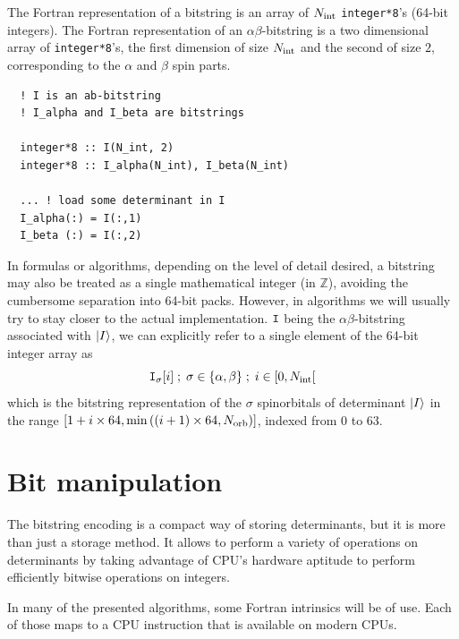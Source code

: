 \documentclass[./thesis.tex]{subfiles}
\begin{document}
The Fortran representation of a bitstring is an array of ${N_\text{int}}$ \lstinline{integer*8}'s (64-bit integers).  
The Fortran representation of an $\alpha \beta$-bitstring is a two dimensional array of \lstinline{integer*8}'s, the first dimension of size ${N_\text{int}}$ and the second of size $2$, corresponding to the $\alpha$ and $\beta$ spin parts.


\lstset{frame=single}
\begin{lstlisting}
  ! I is an ab-bitstring
  ! I_alpha and I_beta are bitstrings
  
  integer*8 :: I(N_int, 2)
  integer*8 :: I_alpha(N_int), I_beta(N_int)

  ... ! load some determinant in I
  I_alpha(:) = I(:,1)
  I_beta (:) = I(:,2)
\end{lstlisting}
\lstset{frame=none}


In formulas or algorithms, depending on the level of detail desired, a bitstring may also be treated as a single mathematical integer (in $\mathbb{Z}$), avoiding the cumbersome separation into 64-bit packs. However, in algorithms we will usually try to stay closer to the actual implementation. ${\texttt{I}}$ being the $\alpha \beta$-bitstring associated with ${\ket{I}}$, we can explicitly refer to a single element of the 64-bit integer array as
\begin{equation}
{\texttt{I}}_{\sigma}[i]\; ;\; \sigma \in \{\alpha, \beta\}\; ;\; i \in [0, {N_\text{int}}[
\end{equation}
which is the bitstring representation of the $\sigma$ spinorbitals of determinant ${\ket{I}}$ in the range $[1+i \times 64, \min \left( (i+1) \times 64, {N_\text{orb}} \right)]$, indexed from $0$ to $63$.

      
\section{Bit manipulation}

The bitstring encoding is a compact way of storing determinants, but it is more than just a storage method. It allows to perform a variety of operations on determinants by taking advantage of CPU's hardware aptitude to perform efficiently bitwise operations on integers.

In many of the presented algorithms, some Fortran intrinsics will be of use. Each of those maps to a CPU instruction that is available on modern CPUs.
\end{document}
